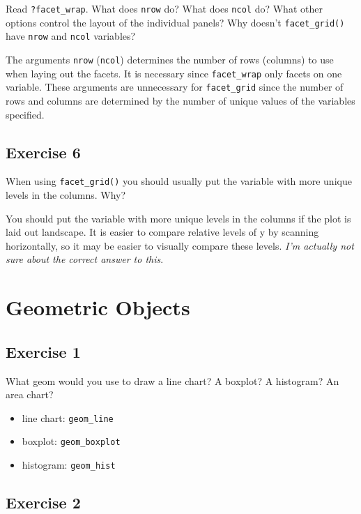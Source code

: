\documentclass[]{book}
\providecommand{\tightlist}{%
  \setlength{\itemsep}{0pt}\setlength{\parskip}{0pt}}
\theoremstyle{plain}
\theoremstyle{remark}
\theoremstyle{definition}
\theoremstyle{definition}
\theoremstyle{definition}
\theoremstyle{remark}
\begin{document}
Read \texttt{?facet\_wrap}. What does \texttt{nrow} do? What does
\texttt{ncol} do? What other options control the layout of the
individual panels? Why doesn't \texttt{facet\_grid()} have \texttt{nrow}
and \texttt{ncol} variables?

The arguments \texttt{nrow} (\texttt{ncol}) determines the number of
rows (columns) to use when laying out the facets. It is necessary since
\texttt{facet\_wrap} only facets on one variable. These arguments are
unnecessary for \texttt{facet\_grid} since the number of rows and
columns are determined by the number of unique values of the variables
specified.

\hypertarget{exercise-6}{%
\subsection{Exercise 6}\label{exercise-6}}

When using \texttt{facet\_grid()} you should usually put the variable
with more unique levels in the columns. Why?

You should put the variable with more unique levels in the columns if
the plot is laid out landscape. It is easier to compare relative levels
of y by scanning horizontally, so it may be easier to visually compare
these levels. \emph{I'm actually not sure about the correct answer to
this}.

\hypertarget{geometric-objects}{%
\section{Geometric Objects}\label{geometric-objects}}

\hypertarget{exercise-1-2}{%
\subsection{Exercise 1}\label{exercise-1-2}}

What geom would you use to draw a line chart? A boxplot? A histogram? An
area chart?

\begin{itemize}
\tightlist
\item
  line chart: \texttt{geom\_line}
\item
  boxplot: \texttt{geom\_boxplot}
\item
  histogram: \texttt{geom\_hist}
\end{itemize}

\hypertarget{exercise-2-2}{%
\subsection{Exercise 2}\label{exercise-2-2}}
\end{document}

